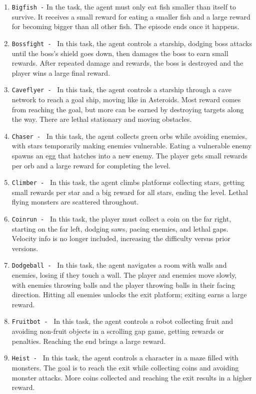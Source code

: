 \documentclass[]{fairmeta}
\begin{document}
\begin{enumerate}
    \item \texttt{Bigfish -} In the task, the agent must only eat fish smaller than itself to survive. It receives a small reward for eating a smaller fish and a large reward for becoming bigger than all other fish. The episode ends once it happens.
    \item \texttt{Bossfight - } In this task, the agent controls a starship, dodging boss attacks until the boss's shield goes down, then damages the boss to earn small rewards. After repeated damage and rewards, the boss is destroyed and the player wins a large final reward.
    \item \texttt{Caveflyer - } In this task, the agent controls a starship through a cave network to reach a goal ship, moving like in Asteroids. Most reward comes from reaching the goal, but more can be earned by destroying targets along the way. There are lethal stationary and moving obstacles.
    \item \texttt{Chaser - } In this task, the agent collects green orbs while avoiding enemies, with stars temporarily making enemies vulnerable. Eating a vulnerable enemy spawns an egg that hatches into a new enemy. The player gets small rewards per orb and a large reward for completing the level.
    \item \texttt{Climber - } In this task, the agent climbs platforms collecting stars, getting small rewards per star and a big reward for all stars, ending the level. Lethal flying monsters are scattered throughout.
    \item \texttt{Coinrun - } In this task, the player must collect a coin on the far right, starting on the far left, dodging saws, pacing enemies, and lethal gaps. Velocity info is no longer included, increasing the difficulty versus prior versions.
    \item \texttt{Dodgeball - } In this task, the agent navigates a room with walls and enemies, losing if they touch a wall. The player and enemies move slowly, with enemies throwing balls and the player throwing balls in their facing direction. Hitting all enemies unlocks the exit platform; exiting earns a large reward.
    \item \texttt{Fruitbot - } In this task, the agent controls a robot collecting fruit and avoiding non-fruit objects in a scrolling gap game, getting rewards or penalties. Reaching the end brings a large reward.
    \item \texttt{Heist - } In this task, the agent controls a character in a maze filled with monsters. The goal is to reach the exit while collecting coins and avoiding monster attacks. More coins collected and reaching the exit results in a higher reward.

\end{enumerate}
\end{document}
